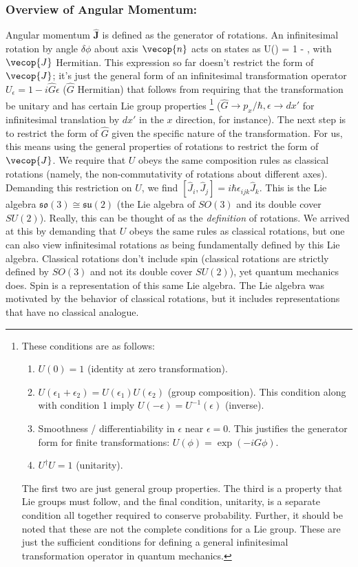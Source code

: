 \subsubsection{Overview of Angular Momentum:}
Angular momentum $\hat{\mathbf{J}}$ is defined as the generator of rotations. An infinitesimal rotation by angle $\delta\phi$ about axis $\vecop{n}$ acts on states as
\bea
    U(\delta\phi) = 1 - \delta\phi{}\cdot{},
\eea
with $\vecop{J}$ Hermitian. This expression so far doesn't restrict the form of $\vecop{J}$; it's just the general form of an infinitesimal transformation operator $U_\epsilon=1-i\hat{G}\epsilon$ ($\hat{G}$ Hermitian) that follows from requiring that the transformation be unitary and has certain Lie group properties \footnote{
These conditions are as follows: 
\begin{enumerate}
    \item $U(0)=1$ (identity at zero transformation).
    \item $U(\epsilon_1+\epsilon_2)=U(\epsilon_1)U(\epsilon_2)$ (group composition). This condition along with condition 1 imply $U(-\epsilon)=U^{-1}(\epsilon)$ (inverse).
    \item Smoothness / differentiability in $\epsilon$ near $\epsilon=0$. This justifies the generator form for finite transformations: $U(\phi)=\exp(-iG\phi)$.
    \item $U^\dagger U=1$ (unitarity).
\end{enumerate}
The first two are just general group properties. The third is a property that Lie groups must follow, and the final condition, unitarity, is a separate condition all together required to conserve probability. Further, it should be noted that these are not the complete conditions for a Lie group. These are just the sufficient conditions for defining a general infinitesimal transformation operator in quantum mechanics. 
} ($\hat{G}\rightarrow p_x/\hbar, \epsilon\rightarrow dx'$ for infinitesimal translation by $dx'$ in the $x$ direction, for instance). The next step is to restrict the form of $\hat{G}$ given the specific nature of the transformation. For us, this means using the general properties of rotations to restrict the form of $\vecop{J}$. We require that $U$ obeys the same composition rules as classical rotations (namely, the non-commutativity of rotations about different axes). Demanding this restriction on $U$, we find $[\hat{J}_i, \hat{J}_j]=i\hbar \epsilon_{ijk}\hat{J}_k$. This is the Lie algebra $\mathfrak{so}(3)\cong \mathfrak{su}(2)$ (the Lie algebra of $SO(3)$ and its double cover $SU(2)$). Really, this can be thought of as the \textit{definition} of rotations. We arrived at this by demanding that $U$ obeys the same rules as classical rotations, but one can also view infinitesimal rotations as being fundamentally defined by this Lie algebra. Classical rotations don't include spin (classical rotations are strictly defined by $SO(3)$ and not its double cover $SU(2)$), yet quantum mechanics does. Spin is a representation of this same Lie algebra. The Lie algebra was motivated by the behavior of classical rotations, but it includes representations that have no classical analogue.\\

